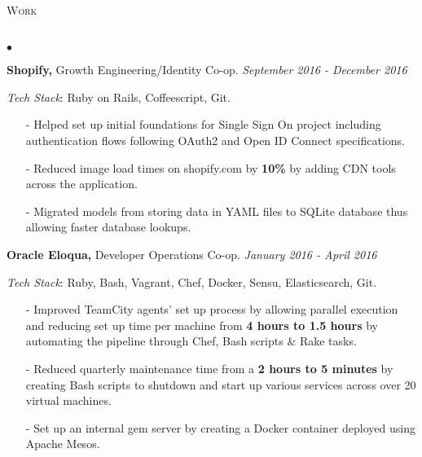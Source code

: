 \documentclass[11pt]{article}
\newcommand{\lineunder}{\vspace*{-8pt} \\ \hspace*{-18pt} \hrulefill \\}
\newcommand{\header}[1]{{\hspace*{-15pt}\vspace*{6pt} \textsc{#1}} \vspace*{-6pt} \lineunder }
\newenvironment{achievements}{\begin{list}{$\bullet$}{\topsep 0pt \itemsep -1.5pt \leftmargin 5pt}}{\vspace*{4pt}\end{list}}
\begin{document}
\header{\fontsize{11.4}{10}\selectfont Work}
\begin{achievements}

\item \textbf{Shopify,} Growth Engineering/Identity Co-op. \hfill \textit {September 2016 - December 2016}

\vspace{1pt}
\item[ ] \textit{Tech Stack}: Ruby on Rails, Coffeescript, Git.
\vspace{3pt}

\begin{itemize}
\item[-] Helped set up initial foundations for Single Sign On project including authentication flows following OAuth2 and Open ID Connect specifications.
\vspace{3pt}
\item[-] Reduced image load times on shopify.com by \textbf{10\%} by adding CDN tools across the application.
\vspace{3pt}
\item[-] Migrated models from storing data in YAML files to SQLite database thus allowing faster database lookups.

\end{itemize}

\vspace{6pt}

\item \textbf{Oracle Eloqua,} Developer Operations Co-op. \hfill \textit {January 2016 - April 2016}

\vspace{1pt}
\item[ ] \textit{Tech Stack}: Ruby, Bash, Vagrant, Chef, Docker, Sensu, Elasticsearch, Git.
\vspace{3pt}

\begin{itemize}
\item[-]Improved TeamCity agents' set up process by allowing parallel execution and reducing set up time per machine from \textbf{4 hours to 1.5 hours} by automating the pipeline through Chef, Bash scripts \& Rake tasks.
\vspace{3pt}
\item[-]Reduced quarterly maintenance time from a \textbf{2 hours to 5 minutes} by creating Bash scripts to shutdown and start up various services across over 20 virtual machines.
\vspace{3pt}
\item[-]Set up an internal gem server by creating a Docker container deployed using Apache Mesos.
\end{itemize}


\end{achievements}
\end{document}
